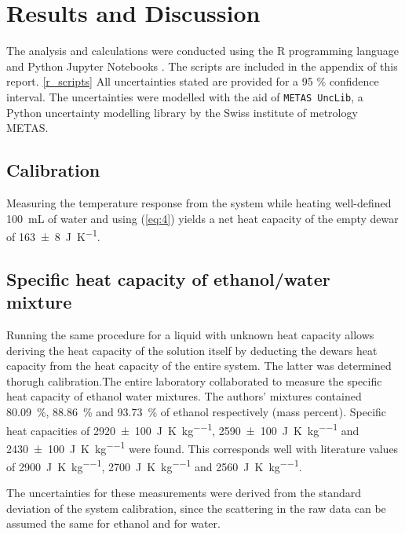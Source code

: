 

\section{Results and Discussion}
The analysis and calculations were conducted using the R programming language \cite{R} and Python Jupyter Notebooks \cite{IPython:2007}. The scripts are included in the appendix of this report. \ref{r_scripts} All uncertainties stated are provided for a 95 \% confidence interval. The uncertainties were modelled with the aid of \texttt{METAS UncLib}, a Python uncertainty modelling library by the Swiss institute of metrology METAS.\cite{unclib}


\subsection{Calibration}

Measuring the temperature response from the system while heating well-defined \qty{100}{\milli\liter} of water and using (\ref{eq:4}) yields a net heat capacity of the empty dewar of \qty{163 \pm 8}{\joule\per\kelvin}.


\subsection{Specific heat capacity of ethanol/water mixture}

Running the same procedure for a liquid with unknown heat capacity allows deriving the heat capacity of the solution itself by deducting the dewars heat capacity from the heat capacity of the entire system. The latter was determined thorugh calibration.The entire laboratory collaborated to measure the specific heat capacity of ethanol water mixtures. The authors' mixtures contained \qty{80.09}{\percent}, \qty{88.86}{\percent} and \qty{93.73}{\percent} of ethanol respectively (mass percent). Specific heat capacities of \qty{2920 \pm 100}{\joule\per\kelvin\per\kilo\gram}, \qty{2590 \pm 100}{\joule\per\kelvin\per\kilo\gram} and \qty{2430 \pm 100}{\joule\per\kelvin\per\kilo\gram} were found. This corresponds well with literature values of \qty{2900}{\joule\per\kelvin\per\kilo\gram}, \qty{2700}{\joule\per\kelvin\per\kilo\gram} and \qty{2560}{\joule\per\kelvin\per\kilo\gram}.

The uncertainties for these measurements were derived from the standard deviation of the system calibration, since the scattering in the raw data can be assumed the same for ethanol and for water.



